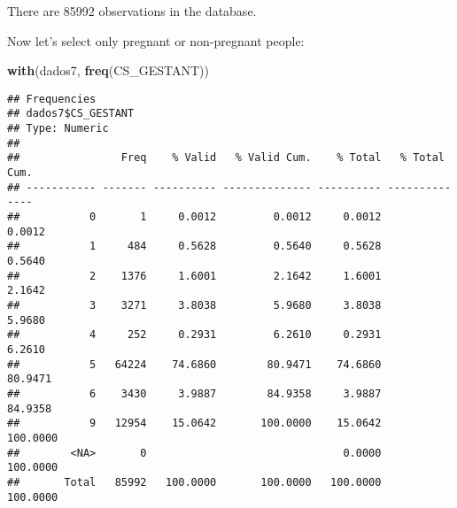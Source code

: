 \documentclass[
]{article}
\newenvironment{Shaded}{\begin{snugshade}}{\end{snugshade}}
\newcommand{\KeywordTok}[1]{\textcolor[rgb]{0.13,0.29,0.53}{\textbf{#1}}}
\newcommand{\NormalTok}[1]{#1}
\begin{document}
There are 85992 observations in the database.

Now let's select only pregnant or non-pregnant people:

\begin{Shaded}
\begin{Highlighting}[]
\KeywordTok{with}\NormalTok{(dados7, }\KeywordTok{freq}\NormalTok{(CS_GESTANT))}
\end{Highlighting}
\end{Shaded}

\begin{verbatim}
## Frequencies  
## dados7$CS_GESTANT  
## Type: Numeric  
## 
##                Freq    % Valid   % Valid Cum.    % Total   % Total Cum.
## ----------- ------- ---------- -------------- ---------- --------------
##           0       1     0.0012         0.0012     0.0012         0.0012
##           1     484     0.5628         0.5640     0.5628         0.5640
##           2    1376     1.6001         2.1642     1.6001         2.1642
##           3    3271     3.8038         5.9680     3.8038         5.9680
##           4     252     0.2931         6.2610     0.2931         6.2610
##           5   64224    74.6860        80.9471    74.6860        80.9471
##           6    3430     3.9887        84.9358     3.9887        84.9358
##           9   12954    15.0642       100.0000    15.0642       100.0000
##        <NA>       0                               0.0000       100.0000
##       Total   85992   100.0000       100.0000   100.0000       100.0000
\end{verbatim}
\end{document}
